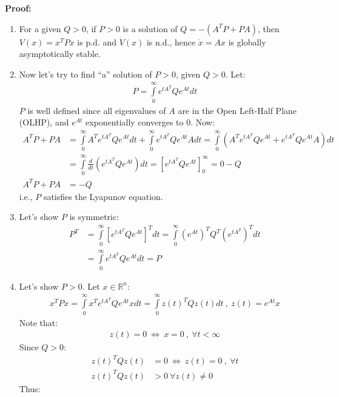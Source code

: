 \documentclass[twoside, 11pt]{article}
\begin{document}
\textbf{Proof:} 
\begin{enumerate}
\item For a given $Q > 0$, if $P > 0$ is a solution of $Q = - (A^T P + P A)$, then $V(x) = x^T P x$ is p.d. and $\dot{V}(x)$ is n.d., hence
$\dot{x} = A x$ is globally asymptotically stable.
%
\item Now let's try to find ``a'' solution of $P > 0$, given $Q>0$. Let:
%
\begin{align*}
P = \int\limits_{0}^{\infty} e^{t A^T} Q e^{A t} dt
\end{align*}
%
$P$ is well defined since all eigenvalues of $A$ are in the Open Left-Half Plane (OLHP), and 
$e^{A t}$ exponentially converges to $0$. Now:
%
\begin{align*}
A^T P + P A &= \int\limits_{0}^{\infty} A^T e^{t A^T} Q e^{A t} dt
+ \int\limits_{0}^{\infty} e^{t A^T} Q e^{A t} A dt 
= \int\limits_{0}^{\infty} \left( A^T e^{t A^T} Q e^{A t} + e^{t A^T} Q e^{A t} A \right) dt
\\
&= \int\limits_{0}^{\infty} \frac{d}{dt} \left(
    e^{t A^T} Q e^{A t}
\right) dt =  \left[
    e^{t A^T} Q e^{A t} 
\right]_{0}^{\infty} = 0 - Q 
\\
A^T P + P A &= -Q
\end{align*}
%
i.e., $P$ satisfies the Lyapunov equation.
%
\item Let's show $P$ is symmetric:
%
\begin{align*}
P^T &= \int\limits_{0}^{\infty} \left[ e^{t A^T} Q e^{A t} \right]^T dt
= \int\limits_{0}^{\infty} \left( e^{A t} \right)^T Q^T 
\left( e^{t A^T} \right)^T dt \\
&= \int\limits_{0}^{\infty} e^{t A^T} Q e^{A t} dt = P
\end{align*}
%
\item Let's show $P > 0$. Let $x \in \mathbb{R}^n$:
%
\begin{align*}
x^T P x = \int\limits_{0}^{\infty} x^T e^{t A^T} Q e^{A t} x dt =
\int\limits_{0}^{\infty} z(t)^T Q z(t) dt \ , \  z(t) = e^{A t} x
\end{align*}
%
Note that:
%
\begin{align*}
z(t) = 0 \ \iff \ x = 0 \ , \  \forall t < \infty
\end{align*}
%
Since $Q > 0$:
%
\begin{align*}
z(t)^T Q z(t) &= 0 \ \iff \ z(t) = 0 \ , \  \forall t 
\\
z(t)^T Q z(t) &> 0 \ \forall z(t) \neq 0
\end{align*}
%
Thus:
%
\begin{align*}

\end{align*}
\end{enumerate}
\end{document}
